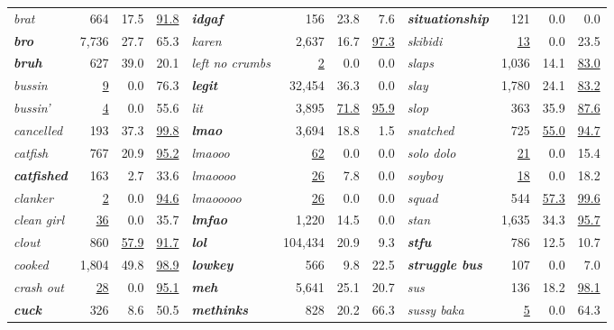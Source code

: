 \documentclass[11pt]{article}
\begin{document}
\begin{table}[tp]
\begin{tabular}{lrrr@{\hskip 2em}lrrr@{\hskip 2em}lrrr}
\textit{brat} & 664 & 17.5 & \underline{91.8} & \textbf{\textit{idgaf}} & 156 & 23.8 & 7.6 & \textbf{\textit{situationship}} & 121 & 0.0 & 0.0 \\
\textbf{\textit{bro}} & 7{,}736 & 27.7 & 65.3 & \textit{karen} & 2{,}637 & 16.7 & \underline{97.3} & \textit{skibidi} & \underline{13} & 0.0 & 23.5 \\
\textbf{\textit{bruh}} & 627 & 39.0 & 20.1 & \textit{left no crumbs} & \underline{2} & 0.0 & 0.0 & \textit{slaps} & 1{,}036 & 14.1 & \underline{83.0} \\
\textit{bussin} & \underline{9} & 0.0 & 76.3 & \textbf{\textit{legit}} & 32{,}454 & 36.3 & 0.0 & \textit{slay} & 1{,}780 & 24.1 & \underline{83.2} \\
\textit{bussin'} & \underline{4} & 0.0 & 55.6 & \textit{lit} & 3{,}895 & \underline{71.8} & \underline{95.9} & \textit{slop} & 363 & 35.9 & \underline{87.6} \\
\textit{cancelled} & 193 & 37.3 & \underline{99.8} & \textbf{\textit{lmao}} & 3{,}694 & 18.8 & 1.5 & \textit{snatched} & 725 & \underline{55.0} & \underline{94.7} \\
\textit{catfish} & 767 & 20.9 & \underline{95.2} & \textit{lmaooo} & \underline{62} & 0.0 & 0.0 & \textit{solo dolo} & \underline{21} & 0.0 & 15.4 \\
\textbf{\textit{catfished}} & 163 & 2.7 & 33.6 & \textit{lmaoooo} & \underline{26} & 7.8 & 0.0 & \textit{soyboy} & \underline{18} & 0.0 & 18.2 \\
\textit{clanker} & \underline{2} & 0.0 & \underline{94.6} & \textit{lmaooooo} & \underline{26} & 0.0 & 0.0 & \textit{squad} & 544 & \underline{57.3} & \underline{99.6} \\
\textit{clean girl} & \underline{36} & 0.0 & 35.7 & \textbf{\textit{lmfao}} & 1{,}220 & 14.5 & 0.0 & \textit{stan} & 1{,}635 & 34.3 & \underline{95.7} \\
\textit{clout} & 860 & \underline{57.9} & \underline{91.7} & \textbf{\textit{lol}} & 104{,}434 & 20.9 & 9.3 & \textbf{\textit{stfu}} & 786 & 12.5 & 10.7 \\
\textit{cooked} & 1{,}804 & 49.8 & \underline{98.9} & \textbf{\textit{lowkey}} & 566 & 9.8 & 22.5 & \textbf{\textit{struggle bus}} & 107 & 0.0 & 7.0 \\
\textit{crash out} & \underline{28} & 0.0 & \underline{95.1} & \textbf{\textit{meh}} & 5{,}641 & 25.1 & 20.7 & \textit{sus} & 136 & 18.2 & \underline{98.1} \\
\textbf{\textit{cuck}} & 326 & 8.6 & 50.5 & \textbf{\textit{methinks}} & 828 & 20.2 & 66.3 & \textit{sussy baka} & \underline{5} & 0.0 & 64.3 \\

\end{tabular}
\end{table}
\end{document}
